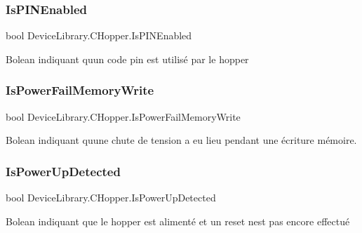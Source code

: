 \subsubsection{\texorpdfstring{Is\+P\+I\+N\+Enabled}{IsPINEnabled}}
{\footnotesize\ttfamily bool Device\+Library.\+C\+Hopper.\+Is\+P\+I\+N\+Enabled\hspace{0.3cm}{\ttfamily [get]}}



Bolean indiquant qu\textquotesingle{}un code pin est utilisé par le hopper 

\mbox{\label{class_device_library_1_1_c_hopper_ab6ddbdf218466891ec4df5b618f22b57}} 
\subsubsection{\texorpdfstring{Is\+Power\+Fail\+Memory\+Write}{IsPowerFailMemoryWrite}}
{\footnotesize\ttfamily bool Device\+Library.\+C\+Hopper.\+Is\+Power\+Fail\+Memory\+Write\hspace{0.3cm}{\ttfamily [get]}}



Bolean indiquant qu\textquotesingle{}une chute de tension a eu lieu pendant une écriture mémoire. 

\mbox{\label{class_device_library_1_1_c_hopper_a5a9d29bab15e199a614d991b6b860c5a}} 
\subsubsection{\texorpdfstring{Is\+Power\+Up\+Detected}{IsPowerUpDetected}}
{\footnotesize\ttfamily bool Device\+Library.\+C\+Hopper.\+Is\+Power\+Up\+Detected\hspace{0.3cm}{\ttfamily [get]}}



Bolean indiquant que le hopper est alimenté et un reset n\textquotesingle{}est pas encore effectué 

